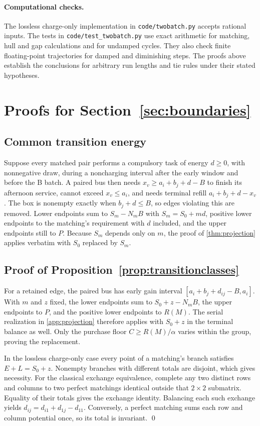 \paragraph{Computational checks.} The lossless charge-only implementation
in \texttt{code/twobatch.py} accepts rational inputs. The tests in
\texttt{code/test\_twobatch.py} use exact arithmetic for matching, hull and
gap calculations and for undamped cycles. They also check finite
floating-point trajectories for damped and diminishing steps. The proofs
above establish the conclusions for arbitrary run lengths and tie rules
under their stated hypotheses.

\section{Proofs for Section~\ref{sec:boundaries}}\label{app:boundaries}

\subsection{Common transition energy}
Suppose every matched pair performs a compulsory task of energy $d\ge0$, with
nonnegative draw, during a noncharging interval after the early window and
before the B batch. A paired bus then needs $x_v\ge a_i+b_j+d-B$ to finish its
afternoon service, cannot exceed $x_v\le a_i$, and needs terminal refill
$a_i+b_j+d-x_v$. The box is nonempty exactly when $b_j+d\le B$, so edges
violating this are removed. Lower endpoints sum to $S_m-N_mB$ with
$S_m=S_0+md$, positive lower endpoints to the matching's requirement with $d$
included, and the upper endpoints still to $P$. Because $S_m$ depends only on $m$,
the proof of \cref{thm:projection} applies verbatim with $S_0$ replaced by $S_m$.

\subsection{Proof of Proposition~\ref{prop:transitionclasses}}
For a retained edge, the paired bus has early gain interval
$[a_i+b_j+d_{ij}-B,a_i]$. With $m$ and $z$ fixed, the lower endpoints sum
to $S_0+z-N_mB$, the upper endpoints to $P$, and the positive lower endpoints
to $R(M)$. The serial realization in \cref{app:projection} therefore applies
with $S_0+z$ in the terminal balance as well. Only the purchase floor
$C\ge R(M)/\alpha$ varies within the group, proving the replacement.

In the lossless charge-only case every point of a matching's branch satisfies
$E+L=S_0+z$. Nonempty branches with different totals are disjoint, which
gives necessity. For the classical exchange equivalence, complete any two
distinct rows and columns to two perfect matchings identical outside that
$2\times2$ submatrix. Equality of their totals gives the exchange identity.
Balancing each such exchange yields $d_{ij}=d_{i1}+d_{1j}-d_{11}$.
Conversely, a perfect matching sums each row and column potential once,
so its total is invariant. \qed

